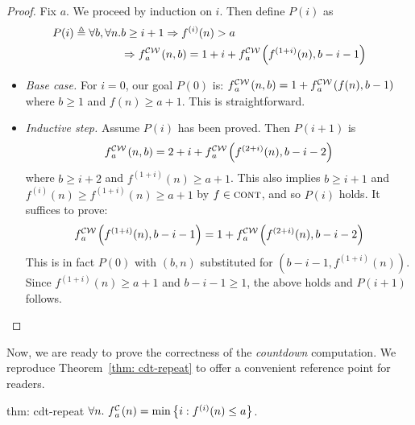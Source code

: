 \begin{proof}
	Fix $a$. We proceed by induction on $i$. Then define $P(i)$ as
	\begin{equation*}
	\begin{aligned}
	P(i) \triangleq \forall b, \forall n. & b\ge i+1 \Rightarrow f^{(i)}(n) > a\\
	 & \Rightarrow \cdw{f}{a}(n, b) = 1 + i + \cdw{f}{a}\left(f^{(1+i)}(n), b - i - 1\right)
	\end{aligned}
	\end{equation*}
	\begin{itemize}[leftmargin=*]
		\item \textit{Base case.} For $i = 0$, our goal $P(0)$ is:
		$\cdw{f}{a}(n, b) = 1 + \cdw{f}{a}\left(f(n), b - 1\right)$
		where $b \ge 1$ and $f(n)\ge a+1$. This is straightforward.
		\item \textit{Inductive step.} Assume $P(i)$ has been proved. Then $P(i+1)$ is
		\begin{equation*}
		\cdw{f}{a}(n, b) = 2 + i + \cdw{f}{a}\left( f^{(2+i)}(n), b - i - 2 \right)
		\end{equation*}
		where $b \ge i+2$ and $f^{(1+i)}(n) \ge a+1$. This also implies $b\ge i+1$ and $\displaystyle f^{(i)}(n) \ge f^{(1+i)}(n)\ge a+1$ by $f\in \text{\scshape{cont}}$, and so $P(i)$ holds. It suffices to prove:
		\begin{equation*}
		\cdw{f}{a}\left(f^{(1+i)}(n), b-i-1\right) = 1 + \cdw{f}{a}\left( f^{(2+i)}(n), b-i-2 \right)
		\end{equation*}
		This is in fact $P(0)$ with $(b, n)$ substituted for $\left(b-i-1, f^{(1+i)}(n)\right)$. Since $f^{(1+i)}(n) \ge a+1$ and $b-i-1\ge 1$, the above holds and $P(i+1)$ follows.
	\end{itemize}
\end{proof}

Now, we are ready to prove the correctness of the \emph{countdown} computation. We reproduce Theorem~\ref{thm: cdt-repeat} to offer a convenient reference point for readers.

\begin{usethmcounterof}{thm: cdt-repeat}
	$	\forall n.~ \cdt{f}{a}(n) = \min\left\{ i : f^{(i)}(n) \le a \right\} $.
\end{usethmcounterof}

